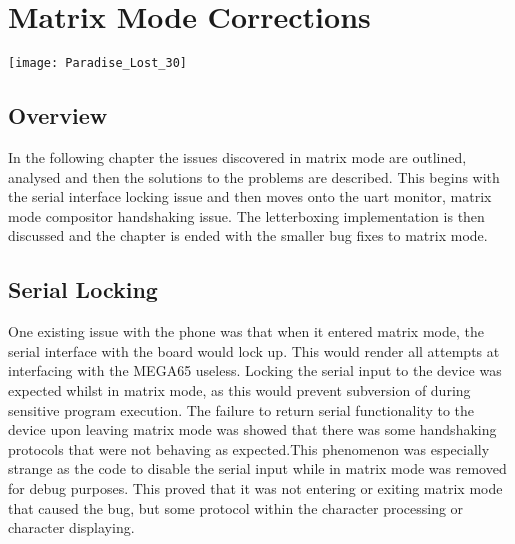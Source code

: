 
\chapter{Matrix Mode Corrections} %

\label{Chapter 5} %

\texttt{[image: Paradise\_Lost\_30]}

\section{Overview}

In the following chapter the issues discovered in matrix mode are outlined, analysed and then the solutions to the problems are described. This begins with the serial interface locking issue and then moves onto the uart monitor, matrix mode compositor handshaking issue. The letterboxing implementation is then discussed and the chapter is ended with the smaller bug fixes to matrix mode.


\section{Serial Locking}

\label{Ch5 Sec1}

One existing issue with the phone was that when it entered matrix mode, the serial interface with the board would lock up. This would render all attempts at interfacing with the MEGA65 useless. Locking the serial input to the device was expected whilst in matrix mode, as this would prevent subversion of during sensitive program execution. The failure to return serial functionality to the device upon leaving matrix mode was showed that there was some handshaking protocols that were not behaving as expected.This phenomenon was especially strange as the code to disable the serial input while in matrix mode was removed for debug purposes. This proved that it was not entering or exiting matrix mode that caused the bug, but some protocol within the character processing or character displaying.

